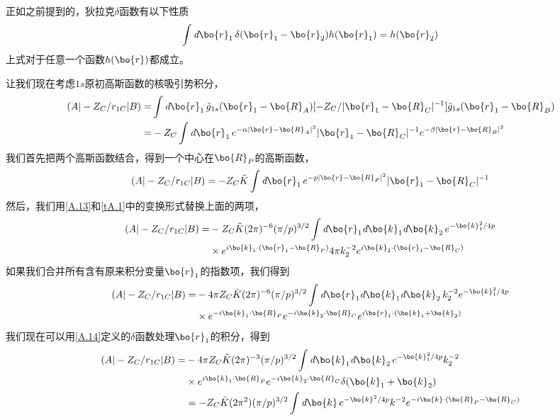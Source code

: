 正如之前提到的，狄拉克$\delta$函数有以下性质
\begin{align}
	\label{A.15}
	\int \emph{d}\bo{r}_1\,\delta(\bo{r}_1-\bo{r}_2)h(\bo{r}_1)=h(\bo{r}_2)
\end{align}
上式对于任意一个函数$h(\bo{r})$都成立。

让我们现在考虑$1s$原初高斯函数的核吸引势积分，
\begin{align}
	\label{A.16}
	(A|-Z_C/r_{1C}|B)=&\int\emph{d}\bo{r}_1\,\tilde{g}_{1s}(\bo{r}_1-\bo{R}_A)
	[-Z_C/|\bo{r}_1-\bo{R}_C|^{-1}]\tilde{g}_{1s}(\bo{r}_1-\bo{R}_B) \nonumber\\
	=&-Z_C\int\emph{d}\bo{r}_1\,e^{-\alpha\lvert \bo{r}-\bo{R}_A \rvert ^2}|\bo{r}_1-\bo{R}_C|^{-1}
	e^{-\beta\lvert \bo{r}-\bo{R}_B \rvert ^2}
\end{align}
我们首先把两个高斯函数结合，得到一个中心在$\bo{R}_P$的高斯函数，
\begin{align}
	\label{A.17}
	(A|-Z_C/r_{1C}|B)=-Z_C\tilde{K}\int\emph{d}\bo{r}_1\,e^{-p\lvert \bo{r}-\bo{R}_P \rvert ^2}|\bo{r}_1-\bo{R}_C|^{-1}
\end{align}
然后，我们用\autoref{A.13}和\autoref{tA.1}中的变换形式替换上面的两项，
\begin{align}
	\label{A.18}
	(A|-Z_C/r_{1C}|B)=&-Z_C\tilde{K}(2\pi)^{-6}(\pi/p)^{3/2}
	\int\emph{d}\bo{r}_1\emph{d}\bo{k}_1\emph{d}\bo{k}_2\,e^{-\bo{k}_1^2/4p}\nonumber\\
	&\times e^{i\bo{k}_1\cdot(\bo{r}_1-\bo{R}_P)}4\pi k_2^{-2}e^{i\bo{k}_2\cdot(\bo{r}_1-\bo{R}_C)}
\end{align}
如果我们合并所有含有原来积分变量$\bo{r}_1$的指数项，我们得到
\begin{align}
	\label{A.19}
	(A|-Z_C/r_{1C}|B)=&-4\pi Z_C\tilde{K}(2\pi)^{-6}(\pi/p)^{3/2}
	\int\emph{d}\bo{r}_1\emph{d}\bo{k}_1\emph{d}\bo{k}_2\,k_2^{-2}e^{-\bo{k}_1^2/4p}\nonumber\\
	&\times e^{-i\bo{k}_1\cdot\bo{R}_P}e^{-i\bo{k}_2\cdot\bo{R}_C}e^{i\bo{r}_1\cdot(\bo{k}_1+\bo{k}_2)}
\end{align}
我们现在可以用\autoref{A.14}定义的$\delta$函数处理$\bo{r}_1$的积分，得到
\begin{align}
	\label{A.20}
	(A|-Z_C/r_{1C}|B)=&-4\pi Z_C\tilde{K}(2\pi)^{-3}(\pi/p)^{3/2}
	\int\emph{d}\bo{k}_1\emph{d}\bo{k}_2\,e^{-\bo{k}_1^2/4p}k_2^{-2}\nonumber\\
	&\times e^{i\bo{k}_1\cdot\bo{R}_P}e^{-i\bo{k}_2\cdot\bo{R}_C}\delta(\bo{k}_1+\bo{k}_2)\nonumber\\
	&=-Z_C\tilde{K}(2\pi^{2})(\pi/p)^{3/2}\int\emph{d}\bo{k}\,e^{-\bo{k}^2/4p}k^{-2} e^{-i\bo{k}\cdot(\bo{R}_P-\bo{R}_C)}
\end{align}
